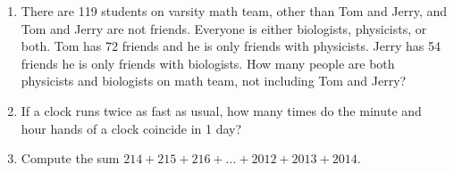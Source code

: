 \documentclass[11pt]{article}
\theoremstyle{definition}
\begin{document}
\begin{enumerate}
\item There are 119 students on varsity math team, other than Tom and Jerry, and Tom and Jerry are not friends. Everyone is either biologists, physicists, or both.  Tom has 72 friends and he is only friends with physicists. Jerry has 54 friends he is only friends with biologists. How many people are both physicists and biologists on math team, not including Tom and Jerry?

\item If a clock runs twice as fast as usual, how many times do the minute and hour hands of a clock coincide in 1 day?

\item Compute the sum $214 + 215 + 216 + \ldots + 2012 + 2013 + 2014$.

\end{enumerate}
\end{document}
